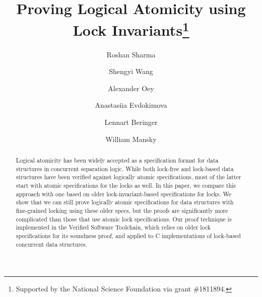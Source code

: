 \documentclass[runningheads]{llncs}
\begin{document}
\title{Proving Logical Atomicity using Lock Invariants\thanks{Supported by the National Science Foundation via grant \#1811894.}}
%
%
\author{Roshan Sharma \and
Shengyi Wang \and
Alexander Oey \and
Anastasiia Evdokimova \and
Lennart Beringer \and
William Mansky} %





\maketitle

\begin{abstract}
Logical atomicity has been widely accepted as a specification format for data structures in concurrent separation logic. While both lock-free and lock-based data structures have been verified against logically atomic specifications, most of the latter start with atomic specifications for the locks as well. In this paper, we compare this approach with one based on older lock-invariant-based specifications for locks. We show that we can still prove logically atomic specifications for data structures with fine-grained locking using these older specs, but the proofs are significantly more complicated than those that use atomic lock specifications. Our proof technique is implemented in the Verified Software Toolchain, which relies on older lock specifications for its soundness proof, and applied to C implementations of lock-based concurrent data structures.

\end{abstract}

\end{document}

